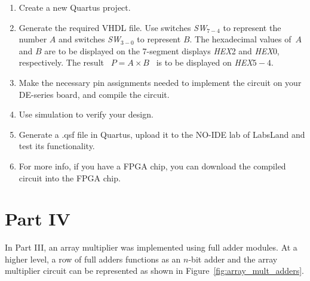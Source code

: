 \documentclass[epsfig,10pt,fullpage]{article}
\begin{document}
\begin{enumerate}
\item Create a new Quartus project.
\item Generate the required VHDL file. Use switches {\it SW}$_{7-4}$ to represent the 
number $A$ and switches {\it SW}$_{3-0}$ to represent $B$. The hexadecimal values of~$A$ 
and $B$ are to be displayed on the 7-segment displays {\it HEX}2 and {\it HEX}0, respectively.
The result ~$P = A \times B$~ is to be displayed on {\it HEX}$5-4$.
\item Make the necessary pin assignments needed to implement the circuit on your
DE-series board, and compile the circuit.
\item Use simulation to verify your design.
\item Generate a .qsf file in Quartus, upload it to the NO-IDE lab of LabsLand and test its functionality.
\item For more info, if you have a FPGA chip, you can download the compiled circuit into the FPGA chip.
\end{enumerate}

\section*{Part IV}
In Part III, an array multiplier was implemented using full adder modules. At a higher level, a row of full adders functions as an $n$-bit adder and the array multiplier circuit can be represented as shown in Figure~\ref{fig:array_mult_adders}.
\end{document}
